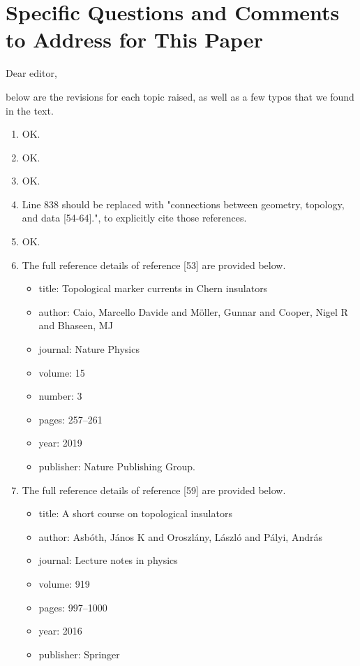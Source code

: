\documentclass[10pt]{revtex4-1}
\begin{document}
\section*{Specific Questions and Comments to Address for This Paper}

Dear editor, 

below are the revisions for each topic raised, as well as a few typos that we found in the text. 

\begin{enumerate} %
    \item OK.
    \item OK.
    \item OK.
    \item Line 838 should be replaced with "connections between geometry, topology, and data [54-64].", to explicitly cite those references. 
    \item OK. 
    \item The full reference details of reference [53] are provided below.
    \begin{itemize}
    \item title: Topological marker currents in Chern insulators
    \item author: Caio, Marcello Davide and M{\"o}ller, Gunnar and Cooper, Nigel R and Bhaseen, MJ
    \item journal: Nature Physics
    \item volume: 15
    \item number: 3
    \item pages: 257--261
    \item year: 2019
    \item publisher: Nature Publishing Group.
    \end{itemize}
    \item The full reference details of reference [59] are provided below. 
    \begin{itemize}
    \item title: A short course on topological insulators
    \item author: Asb{\'o}th, J{\'a}nos K and Oroszl{\'a}ny, L{\'a}szl{\'o} and P{\'a}lyi, Andr{\'a}s
    \item journal: Lecture notes in physics
    \item volume: 919
    \item pages: 997--1000
    \item year: 2016
    \item publisher: Springer

\end{itemize}
\end{enumerate}
\end{document}
